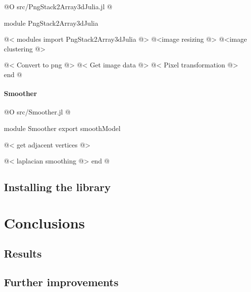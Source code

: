 \documentclass[11pt,oneside]{article}	%
\begin{document}
@O src/PngStack2Array3dJulia.jl
@{module PngStack2Array3dJulia

@< modules import PngStack2Array3dJulia @>
@<image resizing @>
@<image clustering @>

@< Convert to png @>
@< Get image data @>
@< Pixel transformation @>
end
@}

\paragraph{Smoother}

@O src/Smoother.jl
@{module Smoother
export smoothModel

@< get adjacent vertices @>

@< laplacian smoothing @>
end
@}


\subsection{Installing the library}

\section{Conclusions}\label{sec:conclusions}
\subsection{Results}

\subsection{Further improvements}



\appendix
\end{document}
